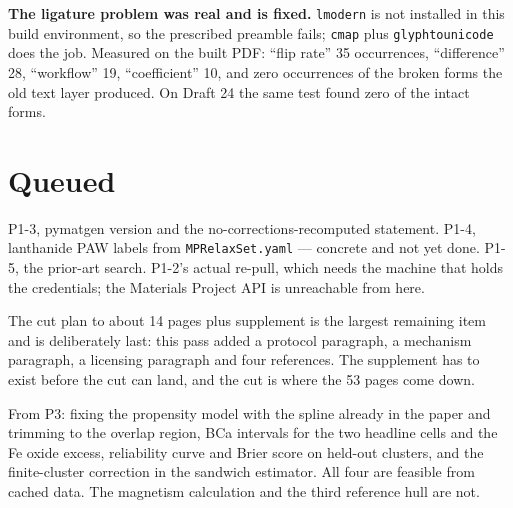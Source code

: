 \documentclass[11pt]{article}
\begin{document}
\textbf{The ligature problem was real and is fixed.} \texttt{lmodern} is not installed in
this build environment, so the prescribed preamble fails; \texttt{cmap} plus
\texttt{glyphtounicode} does the job. Measured on the built PDF: ``flip rate'' 35
occurrences, ``difference'' 28, ``workflow'' 19, ``coefficient'' 10, and zero occurrences of
the broken forms the old text layer produced. On Draft 24 the same test found zero of the intact forms.

\section*{Queued}

P1-3, pymatgen version and the no-corrections-recomputed statement. P1-4, lanthanide PAW
labels from \texttt{MPRelaxSet.yaml} --- concrete and not yet done. P1-5, the prior-art
search. P1-2's actual re-pull, which needs the machine that holds the credentials; the
Materials Project API is unreachable from here.

The cut plan to about 14 pages plus supplement is the largest remaining item and is
deliberately last: this pass added a protocol paragraph, a mechanism paragraph, a licensing
paragraph and four references. The supplement has to exist before the cut can land, and the
cut is where the 53 pages come down.

From P3: fixing the propensity model with the spline already in the paper and trimming to
the overlap region, BCa intervals for the two headline cells and the Fe oxide excess,
reliability curve and Brier score on held-out clusters, and the finite-cluster correction in
the sandwich estimator. All four are feasible from cached data. The magnetism calculation
and the third reference hull are not.
\end{document}
